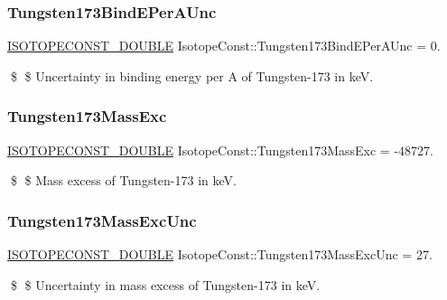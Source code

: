 \subsubsection{\texorpdfstring{Tungsten173\+Bind\+E\+Per\+A\+Unc}{Tungsten173BindEPerAUnc}}
{\footnotesize\ttfamily \mbox{\hyperlink{group___isotope_const-_macros_ga8f45a7272ce02c0b4c65c44636ed719a}{I\+S\+O\+T\+O\+P\+E\+C\+O\+N\+S\+T\+\_\+\+D\+O\+U\+B\+LE}} Isotope\+Const\+::\+Tungsten173\+Bind\+E\+Per\+A\+Unc = 0.}

\$ \$ Uncertainty in binding energy per A of Tungsten-\/173 in keV. \mbox{\label{group___isotope_const-_tungsten-_w173_ga12f8e2360a75fcf7dca6adae4318a2d7}} 
\subsubsection{\texorpdfstring{Tungsten173\+Mass\+Exc}{Tungsten173MassExc}}
{\footnotesize\ttfamily \mbox{\hyperlink{group___isotope_const-_macros_ga8f45a7272ce02c0b4c65c44636ed719a}{I\+S\+O\+T\+O\+P\+E\+C\+O\+N\+S\+T\+\_\+\+D\+O\+U\+B\+LE}} Isotope\+Const\+::\+Tungsten173\+Mass\+Exc = -\/48727.}

\$ \$ Mass excess of Tungsten-\/173 in keV. \mbox{\label{group___isotope_const-_tungsten-_w173_ga5772dd6d5d2949b38928f40b8253cccc}} 
\subsubsection{\texorpdfstring{Tungsten173\+Mass\+Exc\+Unc}{Tungsten173MassExcUnc}}
{\footnotesize\ttfamily \mbox{\hyperlink{group___isotope_const-_macros_ga8f45a7272ce02c0b4c65c44636ed719a}{I\+S\+O\+T\+O\+P\+E\+C\+O\+N\+S\+T\+\_\+\+D\+O\+U\+B\+LE}} Isotope\+Const\+::\+Tungsten173\+Mass\+Exc\+Unc = 27.}

\$ \$ Uncertainty in mass excess of Tungsten-\/173 in keV. \mbox{\label{group___isotope_const-_tungsten-_w173_gaeeda70f5a1b92c541adeca789fe7eac4}} 

